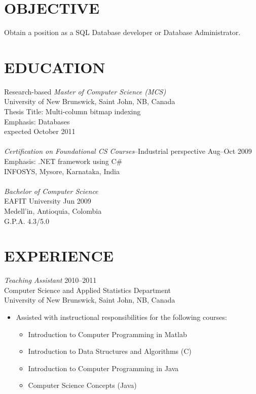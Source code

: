 \documentclass[line,margin]{res}
\begin{document}
\address{19603 Fernhaven, Katy, TX 77449}
\address{(281) 398-9692\\edvelez.g@gmail.com}

 
\begin{resume}

\section{OBJECTIVE} %
\label{sec:objective}
    Obtain a position as a SQL Database developer or Database Administrator.

\section{EDUCATION} %
\label{sec:education}
    Research-based {\sl Master of Computer Science (MCS)} \\
    University of New Brunswick, Saint John, NB, Canada\\
    Thesis Title: Multi-column bitmap indexing\\
    Emphasis: Databases\\
    expected October 2011 \\\\
    {\sl Certification on Foundational CS Courses}--Industrial perspective \hfill Aug--Oct 2009\\
    Emphasis: .NET framework using C\#\\
    INFOSYS, Mysore, Karnataka, India\\\\
    {\sl Bachelor of Computer Science}\\
    EAFIT University \hfill Jun 2009\\
    Medell\a'in, Antioquia, Colombia\\
    G.P.A. 4.3/5.0\\

\section{EXPERIENCE} %
\label{sec:experience}

{\sl Teaching Assistant} \hfill 2010--2011\\
Computer Science and Applied Statistics Department\\
University of New Brunswick, Saint John, NB, Canada
\begin{itemize} %
    \item Assisted with instructional responsibilities for the following courses:
    \begin{itemize} \itemsep -2pt
        \item Introduction to Computer Programming in Matlab
        \item Introduction to Data Structures and Algorithms (C)
        \item Introduction to Computer Programming in Java
        \item Computer Science Concepts (Java)
    \end{itemize}
\end{itemize}


\end{resume}
\end{document}
